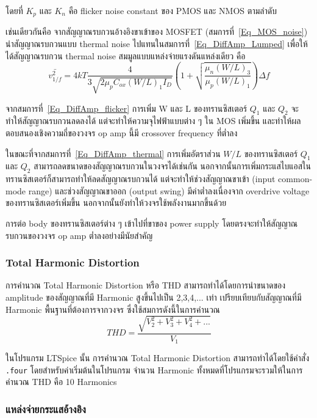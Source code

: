 \documentclass[a4paper, 11pt, oneside]{book} %
\begin{document}
โดยที่ $K_p$ และ $K_n$ คือ flicker noise constant ของ PMOS และ NMOS ตามลำดับ

เช่นเดียวกันคือ จากสัญญาณรบกวนอ้างอิงขาเข้าของ MOSFET (สมการที่~\ref{Eq_MOS_noise})  นำสัญญาณรบกวนแบบ thermal noise ไปแทนในสมการที่~\ref{Eq_DiffAmp_Lumped} เพื่อให้ได้สัญญาณรบกวน thermal noise สมมูลแบบแหล่งจ่ายแรงดันแหล่งเดียว คือ
\begin{equation}
    \bar{v_{1/f}^2} = 4kT\frac{4}{3\sqrt{2\mu_pC_{ox}(W/L)_1I_D}}(1+\sqrt
    {\frac{\mu_n(W/L)_3}{\mu_p(W/L)_1}})\Delta f
    \label{Eq_DiffAmp_thermal}
\end{equation}

จากสมการที่~\ref{Eq_DiffAmp_flicker} การเพิ่ม W และ L ของทรานซิสเตอร์ $Q_1$ และ $Q_2$ จะทำให้สัญญาณรบกวนลดลงได้ แต่จะทำให้ความจุไฟฟ้าแบบต่าง ๆ ใน MOS เพิ่มขึ้น และทำให้ผลตอบสนองเชิงความถี่ของวงจร op amp นี้มี crossover frequency ที่ต่ำลง

ในขณะที่จากสมการที่~\ref{Eq_DiffAmp_thermal} การเพิ่มอัตราส่วน $W/L$ ของทรานซิสเตอร์ $Q_1$ และ $Q_2$ สามารถลดขนาดของสัญญาณรบกวนในวงจรได้เช่นกัน นอกจากนั้นการเพิ่มกระแสไบแอสในทรานซิสเตอร์ก็สามารถทำให้ลดสัญญาณรบกวนได้ แต่จะทำให้ช่วงสัญญาณขาเข้า (input common-mode range) และช่วงสัญญาณขาออก (output swing) มีค่าต่ำลงเนื่องจาก overdrive voltage ของทรานซิสเตอร์เพิ่มขึ้น นอกจากนั้นยังทำให้วงจรใช้พลังงานมากขึ้นด้วย

การต่อ body ของทรานซิสเตอร์ต่าง ๆ เข้าไปที่ขาของ power supply โดยตรงจะทำให้สัญญาณรบกวนของวงจร op amp ต่ำลงอย่างมีนัยสำคัญ

\subsubsection{Total Harmonic Distortion}

การคำนวณ Total Harmonic Distortion หรือ THD สามารถทำได้โดยการนำขนาดของ amplitude ของสัญญาณที่มี Harmonic สูงขึ้นไปเป็น 2,3,4,... เท่า เปรียบเทียบกับสัญญาณที่มี Harmonic พื้นฐานที่ต้องการจากวงจร ซึ่งใช้สมการดังนี้ในการคำนวณ
\begin{equation}
    THD = \frac{\sqrt{V_2^2 + V_3^2 + V_4^2 + ...}}{V_1}
\end{equation}

ในโปรแกรม LTSpice นั้น การคำนวณ Total Harmonic Distortion สามารถทำได้โดยใช้คำสั่ง \lstinline{.four} โดยสำหรับค่าเริ่มต้นในโปรแกรม จำนวน Harmonic ทั้งหมดที่โปรแกรมจะรวมให้ในการคำนวณ THD คือ 10 Harmonics

\subsubsection{แหล่งจ่ายกระแสอ้างอิง}
\end{document}
